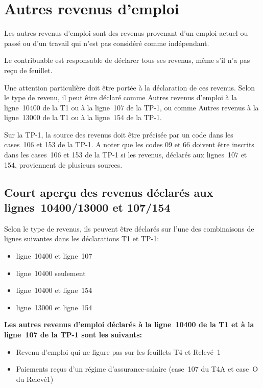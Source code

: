 \section{Autres revenus d'emploi}
\begin{intro}
	Les autres revenus d'emploi sont des revenus provenant d'un emploi actuel ou passé ou d'un travail qui n'est pas considéré comme indépendant.
\end{intro}
\begin{note}
	Le contribuable est responsable de déclarer tous ses revenus, même s'il n'a pas reçu de feuillet.
\end{note}
Une attention particulière doit être portée à la déclaration de ces revenus. Selon le type de revenu, il peut être déclaré comme \og Autres revenus d'emploi\fg{} à la ligne~10400 de la T1 ou à la ligne~107 de la TP-1, ou comme \og Autres revenus\fg{} à la ligne~13000 de la T1 ou à la ligne~154 de la TP-1.

Sur la TP-1, la source des revenus doit être précisée par un code dans les cases~106 et 153 de la TP-1. A noter que les codes 09 et 66 doivent être inscrits dans les cases~106 et 153 de la TP-1 si les revenus, déclarés aux lignes~107 et 154, proviennent de plusieurs sources.


\subsection{Court aperçu des revenus déclarés aux lignes~10400/13000 et 107/154}
Selon le type de revenus, ils peuvent être déclarés sur l'une des combinaisons de lignes suivantes dans les déclarations  T1 et TP-1:
\begin{itemize}
	\item ligne~10400 et ligne~107
	\item ligne~10400 seulement
	\item ligne~10400 et ligne~154
	\item ligne~13000 et ligne~154
\end{itemize}

\textbf{Les autres revenus d'emploi déclarés à la ligne~10400 de la T1 et à la ligne~107 de la TP-1 sont les suivants:}
\begin{itemize}
	\item Revenu d'emploi qui ne figure pas sur les feuillets T4 et Relevé~1
	\item Paiements reçus d'un régime d'assurance-salaire (case~107 du T4A et case~O du Relevé1)
\end{itemize}

